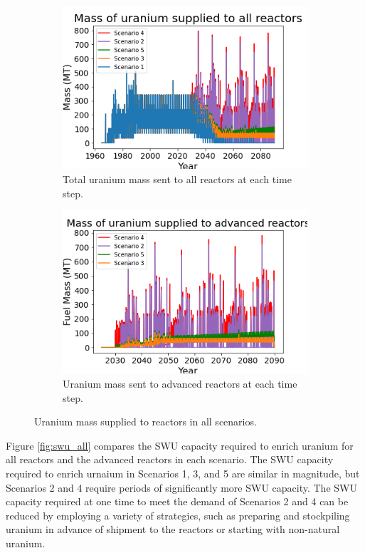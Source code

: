 \begin{figure}
    \centering
    \begin{subfigure}{0.5\textwidth}
        \centering
        \includegraphics[scale=0.5]{../figures/fuelsupply_scenarios_all.png}
        \caption{Total uranium mass sent to all reactors at each time step.}
        \label{fig:totalfuel_all}
    \end{subfigure}
    \hspace{0.8cm}
    \begin{subfigure}{0.5\textwidth}
        \centering
        \includegraphics[scale=0.5]{../figures/advancedRX_fuelsupply_scenarios_2-5.png}
        \caption{Uranium mass sent to advanced reactors at each time step.}
        \label{fig:haleufuel_all}
    \end{subfigure}
    \caption{Uranium mass supplied to reactors in all scenarios.}
    \label{fig:fuel_all}
\end{figure}

Figure \ref{fig:swu_all} compares the \gls{SWU} capacity required to enrich uranium for 
all reactors and the advanced reactors in each scenario. The \gls{SWU} capacity required 
to enrich urnaium in Scenarios 1, 3, and 5 are similar in magnitude, but Scenarios 2 and 4
require periods of significantly more \gls{SWU} capacity. The \gls{SWU} capacity 
required at one time to meet the demand of Scenarios 2 and 4 can be reduced by 
employing a variety of strategies, such as preparing and stockpiling uranium in advance 
of shipment to the reactors or starting with non-natural uranium. 

